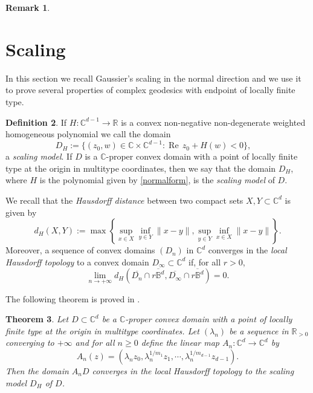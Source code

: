 \documentclass[11pt, reqno]{amsart}
\numberwithin{equation}{section}
\newtheorem{theorem}{Theorem}[section]
\theoremstyle{definition}
\newtheorem{remark}[theorem]{Remark}
\newtheorem{definition}[theorem]{Definition}
\newcommand{\C}{\mathbb{C}}
\newcommand{\B}{\mathbb{B}}
\newcommand{\R}{\mathbb{R}}
\renewcommand{\Re}{{\operatorname{Re}\,}}
\begin{document}
{\begin{remark}
			
		\end{remark}
		\section{Scaling}\label{scalingsect}
		In this section we recall Gaussier's scaling in the normal direction and we use it to prove several properties of complex geodesics with endpoint of locally finite type.
		\begin{definition}
			If $H\colon\C^{d-1}\to \R$ is a convex non-negative non-degenerate weighted homogeneous polynomial 
			we call the domain $$D_H:=\{(z_0,w)\in\C\times \C^{d-1}: \Re z_0+H(w)<0\},\quad $$ a {\sl scaling model}.
			If $D$ is a $\C$-proper convex domain with a point of locally finite type at the origin  in multitype coordinates,
			then we say that the domain $D_H$, where $H$ is the polynomial given by \eqref{normalform}, is the {\sl scaling model} of $D$.
		\end{definition}
		We recall that the {\sl Hausdorff distance} between two compact sets $X,Y\subset \C^d$ is given by
		$$d_H(X,Y):=\max\left\{\sup_{x\in X}\inf_{y\in Y}\|x-y\|,\sup_{y\in Y}\inf_{x\in X}\|x-y\|\right\}.$$
		Moreover, a sequence of convex domains $(D_n)$ in $\C^d$ converges in the {\sl local Hausdorff topology} to a convex domain $D_\infty\subset \C^d$ if, for all $r>0$, 
		$$\lim_{n\to+\infty}d_H(\overline{D_n}\cap \overline{r\B^d},\overline{D_\infty}\cap \overline{r\B^d})=0.$$
		
		The following theorem is proved in \cite{Gauss}.
		\begin{theorem}
			Let $D\subset\C^d$ be a $\C$-proper convex domain  with a point of locally finite type at the origin  in multitype coordinates.
			Let $(\lambda_n)$ be a sequence in $\R_{>0}$ converging to $+\infty$ and for all $n\geq 0$ define the linear map $A_n\colon \C^d\to \C^d$ by
			$$A_n(z)=(\lambda_n z_0,\lambda_n^{1/m_1}z_1,\cdots,\lambda_n^{1/m_{d-1}}z_{d-1}).$$ Then the domain $A_nD$ converges in the local Hausdorff topology to the scaling model $D_H$ of $D$. 
		\end{theorem}
		
}
\end{document}
